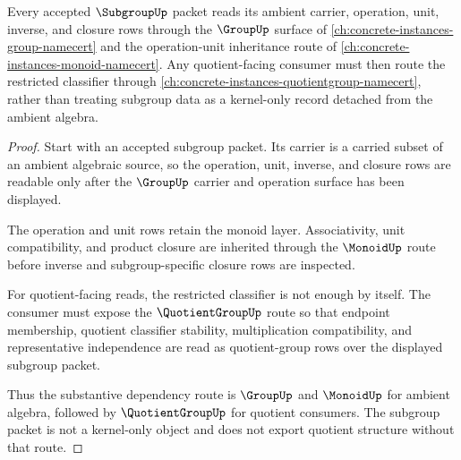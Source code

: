 \begin{theorem}
\label{thm:subgroup-group-quotient-dependency-route}
Every accepted $\SubgroupUp$ packet reads its ambient carrier, operation, unit, inverse, and closure rows through the $\GroupUp$ surface of \autoref{ch:concrete-instances-group-namecert} and the operation-unit inheritance route of \autoref{ch:concrete-instances-monoid-namecert}. Any quotient-facing consumer must then route the restricted classifier through \autoref{ch:concrete-instances-quotientgroup-namecert}, rather than treating subgroup data as a kernel-only record detached from the ambient algebra.
\end{theorem}
\begin{proof}
Start with an accepted subgroup packet. Its carrier is a carried subset of an ambient algebraic source, so the operation, unit, inverse, and closure rows are readable only after the $\GroupUp$ carrier and operation surface has been displayed.

The operation and unit rows retain the monoid layer. Associativity, unit compatibility, and product closure are inherited through the $\MonoidUp$ route before inverse and subgroup-specific closure rows are inspected.

For quotient-facing reads, the restricted classifier is not enough by itself. The consumer must expose the $\QuotientGroupUp$ route so that endpoint membership, quotient classifier stability, multiplication compatibility, and representative independence are read as quotient-group rows over the displayed subgroup packet.

Thus the substantive dependency route is $\GroupUp$ and $\MonoidUp$ for ambient algebra, followed by $\QuotientGroupUp$ for quotient consumers. The subgroup packet is not a kernel-only object and does not export quotient structure without that route.
\end{proof}
